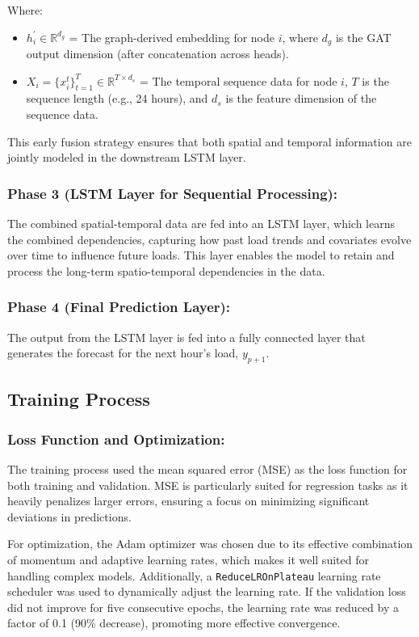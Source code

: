 \documentclass[sigconf,nonacm]{acmart}
\begin{document}
Where:
\begin{itemize}
    \item $h_i^{'} \in \mathbb{R}^{d_g}$ = The graph-derived embedding for node $i$, where $d_g$ is the GAT output dimension (after concatenation across heads).
    \item $X_i = \{x_i^t\}_{t=1}^T \in \mathbb{R}^{T \times d_s}$ = The temporal sequence data for node $i$, $T$ is the sequence length (e.g., 24 hours), and $d_s$ is the feature dimension of the sequence data.
\end{itemize}

This early fusion strategy ensures that both spatial and temporal information are jointly modeled in the downstream LSTM layer.

\subsubsection*{\textbf{Phase 3 (LSTM Layer for Sequential Processing):}} The combined spatial-temporal data are fed into an LSTM layer, which learns the combined dependencies, capturing how past load trends and covariates evolve over time to influence future loads. This layer enables the model to retain and process the long-term spatio-temporal dependencies in the data.

\subsubsection*{\textbf{Phase 4 (Final Prediction Layer):}} The output from the LSTM layer is fed into a fully connected layer that generates the forecast for the next hour's load, $y_{p+1}$.

\subsection{Training Process}
\subsubsection*{\textbf{Loss Function and Optimization:}} The training process used the mean squared error (MSE) as the loss function for both training and validation. MSE is particularly suited for regression tasks as it heavily penalizes larger errors, ensuring a focus on minimizing significant deviations in predictions.

For optimization, the Adam optimizer was chosen due to its effective combination of momentum and adaptive learning rates, which makes it well suited for handling complex models. Additionally, a \texttt{ReduceLROnPlateau} learning rate scheduler was used to dynamically adjust the learning rate. If the validation loss did not improve for five consecutive epochs, the learning rate was reduced by a factor of 0.1 (90\% decrease), promoting more effective convergence.
\end{document}
